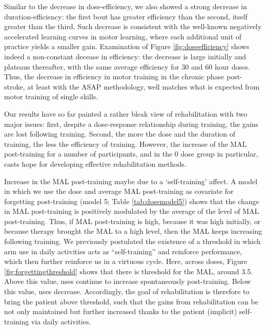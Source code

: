 Similar to the decrease in dose-efficiency, we also showed a strong decrease in duration-efficiency: the first bout has greater efficiency than the second, itself greater than the third. 
Such decrease is consistent with the well-known negatively accelerated learning curves in motor learning, where each additional unit of practice yields a smaller gain. 
Examination of Figure \ref{fig:doseefficiency} shows indeed a non-constant decease in efficiency: the decrease is large initially and plateaus thereafter, with the same average efficiency for 30 and 60 hour doses. 
Thus, the decrease in efficiency in motor training in the chronic phase post-stroke, at least with the ASAP methodology, well matches what is expected from motor training of single skills.

Our results have so far painted a rather bleak view of rehabilitation with two major issues: first, despite a dose-response relationship during training, the gains are lost following training. 
Second, the more the dose and the duration of training, the less the efficiency of training. 
However, the increase of the MAL post-training for a number of participants, and in the 0 dose group in particular, casts hope for developing effective rehabilitation methods. 

Increase in the MAL post-training maybe due to a ‘self-training’ affect. 
A model in which we use the dose and average MAL post-training  as covariate for forgetting post-training (model 5; Table \ref{tab:dosemodel5}) shows that the change in MAL post-training is positively modulated by the average of the level of MAL post-training. 
Thus, if MAL post-training is high, because it was high initially, or because therapy brought the MAL to a high level, then the MAL keeps increasing following training. 
We previously postulated the existence of a threshold in which arm use in daily activities acts as “self-training” and reinforce performance, which then further reinforce us in a virtuous cycle. 
Here, across doses, Figure \ref{fig:forgettingthreshold} shows that there is threshold for the MAL, around 3.5. 
Above this value, uses continue to increase spontaneously post-training. 
Below this value, uses decrease. 
Accordingly, the goal of rehabilitation is therefore to bring the patient above threshold, such that the gains from rehabilitation can be not only maintained but further increased thanks to the patient (implicit) self-training via daily activities. 

